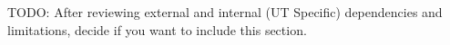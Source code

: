 \label{ch: nonfunctional}

TODO: After reviewing external and internal (UT Specific) dependencies and limitations, decide if you want to include this section.